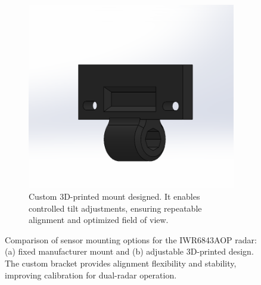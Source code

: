 \begin{figure}[!htbp]
\begin{subfigure}[t]{0.48\linewidth}
        \includegraphics[width=\linewidth]{images/3DModelSensorMount.png}
        \caption{Custom 3D-printed mount designed. It enables controlled tilt adjustments, ensuring repeatable alignment and optimized field of view.}
        \label{fig:IWR6843AOP_3D_sensorMount}
    \end{subfigure}
    \caption{Comparison of sensor mounting options for the IWR6843AOP radar: (a) fixed manufacturer mount and (b) adjustable 3D-printed design. The custom bracket provides alignment flexibility and stability, improving calibration for dual-radar operation.}
    \label{fig:IWR6843AOP_mounts_comparison}
\end{figure}


